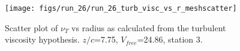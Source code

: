 \begin{figure}[H]
\centering
\texttt{[image: figs/run\_26/run\_26\_turb\_visc\_vs\_r\_meshscatter]}
\caption{Scatter plot of $\nu_T$ vs radius as calculated from the turbulent viscosity hypothesis. $z/c$=7.75, $V_{free}$=24.86, station 3.}
\label{fig:run_26_turb_visc_vs_r_meshscatter}
\end{figure}


